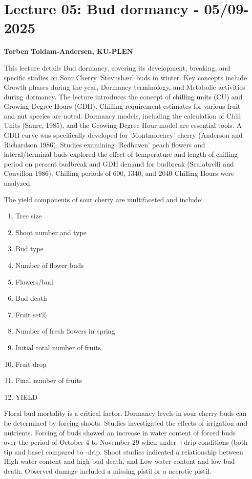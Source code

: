 \section{Lecture 05: Bud dormancy - 05/09-2025}
\textbf{Torben Toldam-Andersen, KU-PLEN}

\vspace{1em}
This lecture details Bud dormancy, covering its development, breaking, and specific studies on Sour Cherry 'Stevnsbær' buds in winter. Key concepts include Growth phases during the year, Dormancy terminology, and Metabolic activities during dormancy. The lecture introduces the concept of chilling units (CU) and Growing Degree Hours (GDH). Chilling requirement estimates for various fruit and nut species are noted. Dormancy models, including the calculation of Chill Units (Saure, 1985), and the Growing Degree Hour model are essential tools. A GDH curve was specifically developed for 'Montmorency' cherry (Anderson and Richardson 1986). Studies examining 'Redhaven' peach flowers and lateral/terminal buds explored the effect of temperature and length of chilling period on percent budbreak and GDH demand for budbreak (Scalabrelli and Couvillon 1986). Chilling periods of 600, 1340, and 2040 Chilling Hours were analyzed.

\vspace{0.5em}
The yield components of sour cherry are multifaceted and include: 

\begin{enumerate} 
    \item Tree size 
    \item Shoot number and type 
    \item Bud type 
    \item Number of flower buds 
    \item Flowers/bud 
    \item Bud death 
    \item Fruit set\% 
    \item Number of fresh flowers in spring 
    \item Initial total number of fruits 
    \item Fruit drop 
    \item Final number of fruits 
    \item YIELD 
\end{enumerate} 

\vspace{0.5em}
Floral bud mortality is a critical factor. Dormancy levels in sour cherry buds can be determined by forcing shoots. Studies investigated the effects of irrigation and nutrients. Forcing of buds showed an increase in water content of forced buds over the period of October 4 to November 29 when under +drip conditions (both tip and base) compared to -drip. Shoot studies indicated a relationship between High water content and high bud death, and Low water content and low bud death. Observed damage included a missing pistil or a necrotic pistil.

